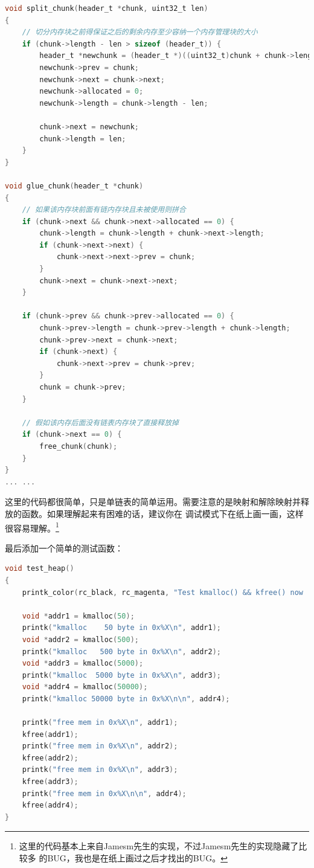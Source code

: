 \begin{lstlisting}[language = C, caption = mm/heap.c]
void split_chunk(header_t *chunk, uint32_t len)
{
	// 切分内存块之前得保证之后的剩余内存至少容纳一个内存管理块的大小
	if (chunk->length - len > sizeof (header_t)) {
		header_t *newchunk = (header_t *)((uint32_t)chunk + chunk->length);
		newchunk->prev = chunk;
		newchunk->next = chunk->next;
		newchunk->allocated = 0;
		newchunk->length = chunk->length - len;

		chunk->next = newchunk;
		chunk->length = len;
	}
}

void glue_chunk(header_t *chunk)
{
	// 如果该内存块前面有链内存块且未被使用则拼合
	if (chunk->next && chunk->next->allocated == 0) {
		chunk->length = chunk->length + chunk->next->length;
		if (chunk->next->next) {
			chunk->next->next->prev = chunk;
		}
		chunk->next = chunk->next->next;
	}

	if (chunk->prev && chunk->prev->allocated == 0) {
		chunk->prev->length = chunk->prev->length + chunk->length;
		chunk->prev->next = chunk->next;
		if (chunk->next) {
			chunk->next->prev = chunk->prev;
		}
		chunk = chunk->prev;
	}

	// 假如该内存后面没有链表内存块了直接释放掉
	if (chunk->next == 0) {
		free_chunk(chunk);
	}
}
... ...
\end{lstlisting}

\par 这里的代码都很简单，只是单链表的简单运用。需要注意的是映射和解除映射并释放的函数。如果理解起来有困难的话，建议你在\allowbreak
调试模式下在纸上画一画，这样很容易理解。\footnote{这里的代码基本上来自Jamesm先生的实现，不过Jamesm先生的实现隐藏了比较多\allowbreak
的BUG，我也是在纸上画过之后才找出的BUG。}

\par 最后添加一个简单的测试函数：

\begin{lstlisting}[language = C, caption = mm/heap.c]
void test_heap()
{
	printk_color(rc_black, rc_magenta, "Test kmalloc() && kfree() now ...\n\n");

	void *addr1 = kmalloc(50);
	printk("kmalloc    50 byte in 0x%X\n", addr1);
	void *addr2 = kmalloc(500);
	printk("kmalloc   500 byte in 0x%X\n", addr2);
	void *addr3 = kmalloc(5000);
	printk("kmalloc  5000 byte in 0x%X\n", addr3);
	void *addr4 = kmalloc(50000);
	printk("kmalloc 50000 byte in 0x%X\n\n", addr4);

	printk("free mem in 0x%X\n", addr1);
	kfree(addr1);
	printk("free mem in 0x%X\n", addr2);
	kfree(addr2);
	printk("free mem in 0x%X\n", addr3);
	kfree(addr3);
	printk("free mem in 0x%X\n\n", addr4);
	kfree(addr4);
}
\end{lstlisting}

